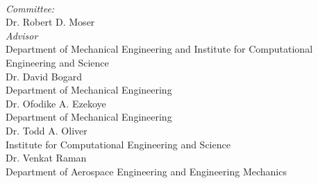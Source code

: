 \begin{titlepage}
\begin{minipage}{0.4\textwidth}
\begin{flushleft} \large
{}%
\end{flushleft}
\end{minipage}
~
\begin{minipage}{0.4\textwidth}
\begin{flushright} \large
\emph{Committee:} \\
 \vspace{5mm}
{\Large Dr. Robert D. Moser} \\
{\normalsize \textsl{Advisor}} \\
{\normalsize Department of Mechanical Engineering and Institute for Computational Engineering and Science} \\
 \vspace{5mm}
{\Large Dr. David Bogard} \\
{\normalsize Department of Mechanical Engineering} \\
 \vspace{5mm}
{\Large Dr. Ofodike A. Ezekoye} \\
{\normalsize Department of Mechanical Engineering} \\
 \vspace{5mm}
{\Large Dr. Todd A. Oliver} \\
{\normalsize Institute for Computational Engineering and Science} \\
 \vspace{5mm}
{\Large Dr. Venkat Raman} \\
{\normalsize Department of Aerospace Engineering and Engineering Mechanics} \\
\end{flushright}
\end{minipage}\\[4cm]




 

\vfill %

\end{titlepage}
%
